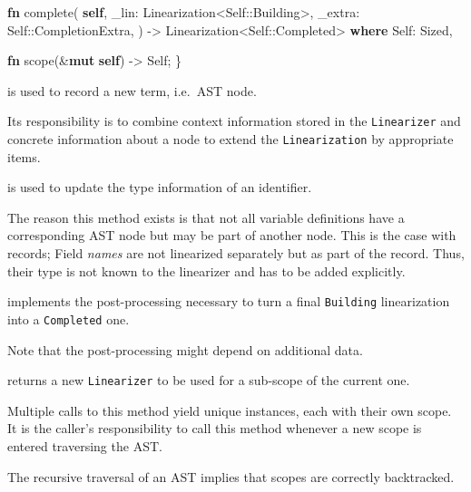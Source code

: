 \documentclass[
  a4paper,
  bibtex,
  english,
  nomenclature]{kthlatex/kththesis/kththesis}
\newenvironment{Shaded}{}{}
\newcommand{\BuiltInTok}[1]{#1}
\newcommand{\DataTypeTok}[1]{\textcolor[rgb]{0.56,0.13,0.00}{#1}}
\newcommand{\KeywordTok}[1]{\textcolor[rgb]{0.00,0.44,0.13}{\textbf{#1}}}
\newcommand{\NormalTok}[1]{#1}
\newcommand{\OperatorTok}[1]{\textcolor[rgb]{0.40,0.40,0.40}{#1}}
\newcommand{\PreprocessorTok}[1]{\textcolor[rgb]{0.74,0.48,0.00}{#1}}
\providecommand{\tightlist}{%
  \setlength{\itemsep}{0pt}\setlength{\parskip}{0pt}}
\begin{document}
\begin{codelisting}
\begin{Shaded}
\begin{Highlighting}[]
    \KeywordTok{fn}\NormalTok{ complete(}
        \KeywordTok{self}\OperatorTok{,}
\NormalTok{        \_lin}\OperatorTok{:}\NormalTok{ Linearization}\OperatorTok{\textless{}}\DataTypeTok{Self}\PreprocessorTok{::}\NormalTok{Building}\OperatorTok{\textgreater{},}
\NormalTok{        \_extra}\OperatorTok{:} \DataTypeTok{Self}\PreprocessorTok{::}\NormalTok{CompletionExtra}\OperatorTok{,}
\NormalTok{    ) }\OperatorTok{{-}\textgreater{}}\NormalTok{ Linearization}\OperatorTok{\textless{}}\DataTypeTok{Self}\PreprocessorTok{::}\NormalTok{Completed}\OperatorTok{\textgreater{}}
    \KeywordTok{where}
        \DataTypeTok{Self}\OperatorTok{:} \BuiltInTok{Sized}\OperatorTok{,}

    \KeywordTok{fn}\NormalTok{ scope(}\OperatorTok{\&}\KeywordTok{mut} \KeywordTok{self}\NormalTok{) }\OperatorTok{{-}\textgreater{}} \DataTypeTok{Self}\OperatorTok{;}
\OperatorTok{\}}
\end{Highlighting}
\end{Shaded}

\end{codelisting}

\begin{description}
\tightlist
\item[\texttt{Linearizer::add\_term}]
is used to record a new term, i.e.~AST node.

Its responsibility is to combine context information stored in the
\texttt{Linearizer} and concrete information about a node to extend the
\texttt{Linearization} by appropriate items.
\item[\texttt{Linearizer::retype\_ident}]
is used to update the type information of an identifier.

The reason this method exists is that not all variable definitions have
a corresponding AST node but may be part of another node. This is the
case with records; Field \emph{names} are not linearized separately but
as part of the record. Thus, their type is not known to the linearizer
and has to be added explicitly.
\item[\texttt{Linearizer::complete}]
implements the post-processing necessary to turn a final
\texttt{Building} linearization into a \texttt{Completed} one.

Note that the post-processing might depend on additional data.
\item[\texttt{Linearizer::scope}]
returns a new \texttt{Linearizer} to be used for a sub-scope of the
current one.

Multiple calls to this method yield unique instances, each with their
own scope. It is the caller's responsibility to call this method
whenever a new scope is entered traversing the AST.

The recursive traversal of an AST implies that scopes are correctly
backtracked.
\end{description}
\end{document}
